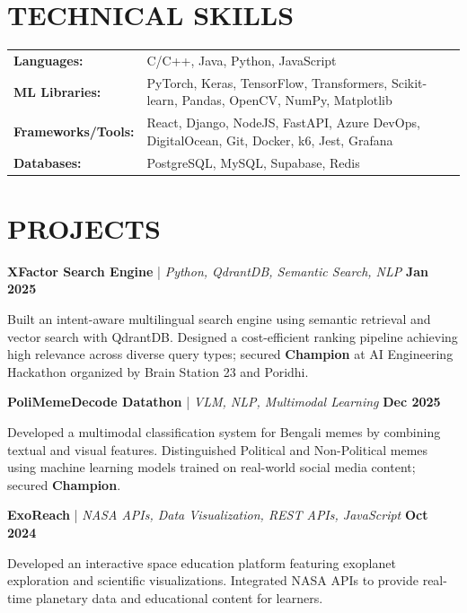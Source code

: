\documentclass[letterpaper,10pt]{article}
\newcommand{\project}[4]{
\vspace{3pt}
\noindent
\textbf{#1}
#2
\hfill
\textbf{#3}

#4
\vspace{4pt}
}
\begin{document}
\section{TECHNICAL SKILLS}
\vspace{1pt}
\begin{tabularx}{\textwidth}{@{} l X @{}}
\textbf{Languages:} & C/C++, Java, Python, JavaScript \\
\textbf{ML Libraries:} & PyTorch, Keras, TensorFlow, Transformers, Scikit-learn, Pandas, OpenCV, NumPy, Matplotlib \\
\textbf{Frameworks/Tools:} & React, Django, NodeJS, FastAPI, Azure DevOps, DigitalOcean, Git, Docker, k6, Jest, Grafana \\
\textbf{Databases:} & PostgreSQL, MySQL, Supabase, Redis\\
\end{tabularx}

\section{PROJECTS}

\project
{XFactor Search Engine}
{\href{https://www.linkedin.com/feed/update/urn:li:activity:7323710240632246272/}{\faIcon{linkedin}}
\;|\; \textit{Python, QdrantDB, Semantic Search, NLP}}
{Jan 2025}
{Built an intent-aware multilingual search engine using semantic retrieval and vector search with QdrantDB. Designed a cost-efficient ranking pipeline achieving high relevance across diverse query types; secured \textbf{Champion} at AI Engineering Hackathon organized by Brain Station 23 and Poridhi.}

\project
{PoliMemeDecode Datathon}
{\href{https://github.com/dipit099/Cuet_PoliMemeDecode}{\faIcon{github}}
\;|\; \textit{VLM, NLP, Multimodal Learning}}
{Dec 2025}
{Developed a multimodal classification system for Bengali memes by combining textual and visual features. Distinguished Political and Non-Political memes using machine learning models trained on real-world social media content; secured \textbf{Champion}.}

\project
{ExoReach}
{\href{https://github.com/dipit099/ExoReach-Nasa_Space_Apps_Project}{\faIcon{github}}
\;|\; \textit{NASA APIs, Data Visualization, REST APIs, JavaScript}}
{Oct 2024}
{Developed an interactive space education platform featuring exoplanet exploration and scientific visualizations. Integrated NASA APIs to provide real-time planetary data and educational content for learners.}
\end{document}
